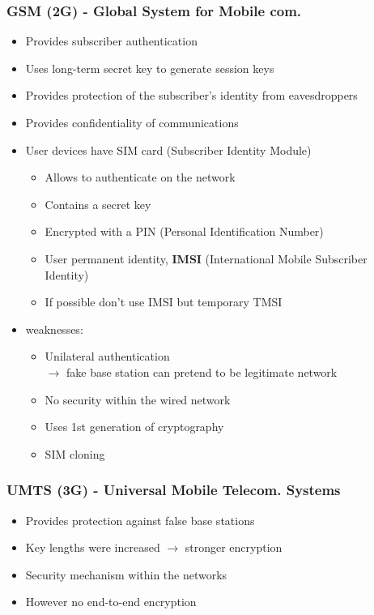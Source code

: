 \subsubsection{GSM (2G) - Global System for Mobile com.}
\begin{itemize}
	\item Provides subscriber authentication
	\item Uses long-term secret key to generate session keys
	\item Provides protection of the subscriber's identity from eavesdroppers
	\item Provides confidentiality of communications
	\item User devices have SIM card (Subscriber Identity Module)
	\begin{itemize}
		\item Allows to authenticate on the network
		\item Contains a secret key
		\item Encrypted with a PIN (Personal Identification Number)
		\item User permanent identity, \textbf{IMSI} (International Mobile Subscriber Identity)
		\item If possible don't use IMSI but temporary TMSI
	\end{itemize}
	\item weaknesses: 
	\begin{itemize}
		\item Unilateral authentication \\
		$\rightarrow$ fake base station can pretend to be legitimate network
		\item No security within the wired network
		\item Uses 1st generation of cryptography
		\item SIM cloning
	\end{itemize}
\end{itemize}
\subsubsection{UMTS (3G) - Universal Mobile Telecom. Systems}
\begin{itemize}
	\item Provides protection against false base stations
	\item Key lengths were increased $\rightarrow$ stronger encryption
	\item Security mechanism within the networks
	\item However no end-to-end encryption
\end{itemize}
